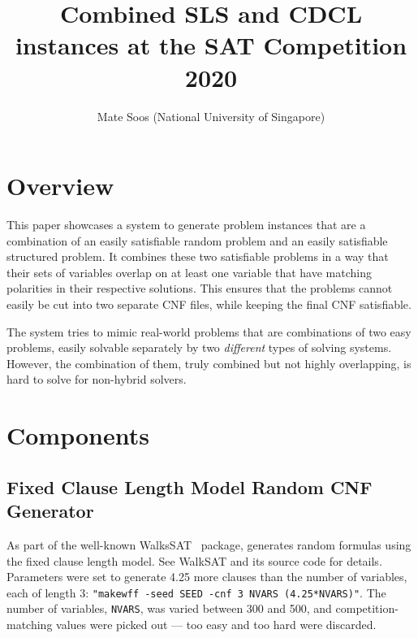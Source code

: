 \documentclass[final]{ieee}
\begin{document}
\title{Combined SLS and CDCL instances at the SAT Competition 2020}
\author{Mate Soos (National University of Singapore)}

\maketitle
\thispagestyle{empty}
\pagestyle{empty}



\section{Overview}
This paper showcases a system to generate problem instances that are a combination of an easily satisfiable random problem and an easily satisfiable structured problem. It combines these two satisfiable problems in a way that their sets of variables overlap on at least one variable that have matching polarities in their respective solutions. This ensures that the problems cannot easily be cut into two separate CNF files, while keeping the final CNF satisfiable.

The system tries to mimic real-world problems that are combinations of two easy problems, easily solvable separately by two \emph{different} types of solving systems. However, the combination of them, truly combined but not highly overlapping, is hard to solve for non-hybrid solvers.


\section{Components}


\subsection{Fixed Clause Length Model Random CNF Generator}
As part of the well-known WalksSAT~\cite{Selman95localsearch} package, generates random formulas using the fixed clause length model. See WalkSAT and its source code for details. Parameters were set to generate 4.25 more clauses than the number of variables, each of length 3:  \texttt{"makewff -seed SEED -cnf 3 NVARS (4.25*NVARS)"}. The number of variables, \texttt{NVARS}, was varied between 300 and 500, and competition-matching values were picked out --- too easy and too hard were discarded.
\end{document}

